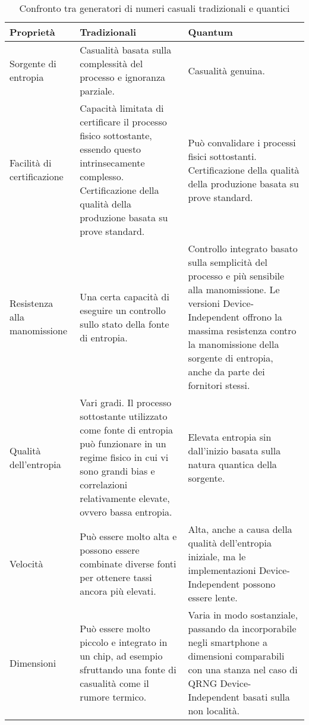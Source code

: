\begin{table}
    \centering
    {\renewcommand{\arraystretch}{2}%
    \begin{tabularx}{\textwidth}{| l | X | X |}
    \hline
    \textbf{Proprietà} & \textbf{Tradizionali} & \textbf{Quantum}  \\ \hline
    Sorgente di entropia  &  Casualità basata sulla complessità del processo e ignoranza parziale.  & Casualità genuina. \\ \hline
    Facilità di certificazione  &  Capacità limitata di certificare il processo fisico sottostante, essendo questo intrinsecamente complesso. Certificazione della qualità della produzione basata su prove standard.  &  Può convalidare i processi fisici sottostanti. Certificazione della qualità della produzione basata su prove standard. \\ \hline
    Resistenza alla manomissione  &  Una certa capacità di eseguire un controllo sullo stato della fonte di entropia.  &  Controllo integrato basato sulla semplicità del processo e più sensibile alla manomissione. Le versioni Device-Independent offrono la massima resistenza contro la manomissione della sorgente di entropia, anche da parte dei fornitori stessi. \\ \hline
    Qualità dell'entropia  &  Vari gradi. Il processo sottostante utilizzato come fonte di entropia può funzionare in un regime fisico in cui vi sono grandi bias e correlazioni relativamente elevate, ovvero bassa entropia. &  Elevata entropia sin dall'inizio basata sulla natura quantica della sorgente. \\ \hline
    Velocità  &  Può essere molto alta e possono essere combinate diverse fonti per ottenere tassi ancora più elevati. &  Alta, anche a causa della qualità dell'entropia iniziale, ma le implementazioni Device-Independent possono essere lente. \\ \hline
    Dimensioni  &  Può essere molto piccolo e integrato in un chip, ad esempio sfruttando una fonte di casualità come il rumore termico.  &  Varia in modo sostanziale, passando da incorporabile negli smartphone a dimensioni comparabili con una stanza nel caso di QRNG Device-Independent basati sulla non località. \\ \hline
    \end{tabularx}}
    \caption{Confronto tra generatori di numeri casuali tradizionali e quantici \cite{piani_quantum_nodate}}
    \label{tab:comparazione-rng}
\end{table}

